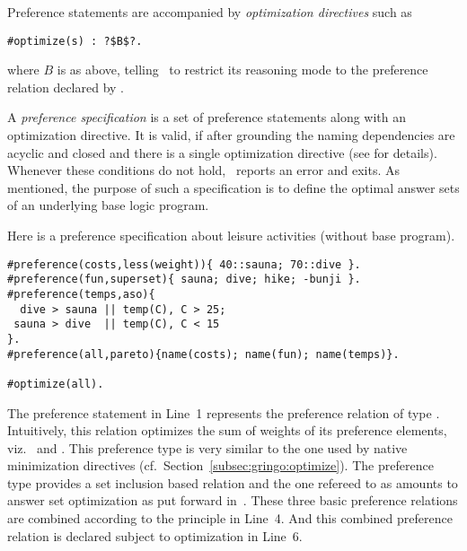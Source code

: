 Preference statements are accompanied by 
\emph{optimization directives} such as
\begin{lstlisting}[numbers=none,escapechar=?]
#optimize(s) : ?$B$?.
\end{lstlisting}
where $B$ is as above, 
telling \asprin\ to restrict its reasoning mode to the preference relation declared by .
% 

A \emph{preference specification} is a set of preference statements along with an optimization directive.
It is valid, if after grounding the naming dependencies are acyclic and closed
and there is a single optimization directive
(see \cite{brderosc15a} for details).
Whenever these conditions do not hold, \asprin\ reports an error and exits.
%
As mentioned,
the purpose of such a specification is to define the optimal answer sets of an underlying base logic program.

\begin{example}\label{asprin:example3}
Here is %
a {preference specification} about leisure activities (without base program).
\begin{lstlisting}[escapechar=?]
#preference(costs,less(weight)){ 40::sauna; 70::dive }.
#preference(fun,superset){ sauna; dive; hike; -bunji }.
#preference(temps,aso){
  dive > sauna || temp(C), C > 25; 
 sauna > dive  || temp(C), C < 15
}.
#preference(all,pareto){name(costs); name(fun); name(temps)}.

#optimize(all).
\end{lstlisting}
The preference statement in Line~1 represents the preference relation  of type .
Intuitively, this relation optimizes the sum of weights of its preference elements, 
viz.\  and .
This preference type is very similar to the one used by native minimization directives (cf.\ Section~\ref{subsec:gringo:optimize}).
The preference type  provides a set inclusion based relation and the one refereed to as 
amounts to answer set optimization as put forward in~\cite{brnitr03a}.
These three basic preference relations are combined according to the  principle in Line~4.
And this combined preference relation is declared subject to optimization in Line~6.
\end{example}
%


